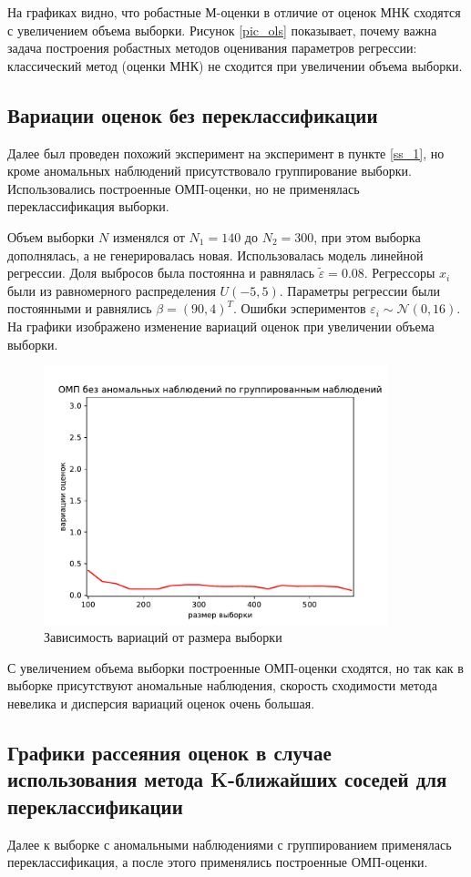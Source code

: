 На графиках видно, что робастные М-оценки в отличие от оценок МНК сходятся с увеличением объема выборки. 
Рисунок \ref{pic_ols} показывает, почему важна задача построения робастных методов оценивания параметров регрессии: классический метод (оценки МНК) не сходится при увеличении объема выборки.

\subsection{Вариации оценок без переклассификации}
Далее был проведен похожий эксперимент на эксперимент в пункте \ref{ss_1}, но кроме аномальных наблюдений присутствовало группирование выборки. Использовались построенные ОМП-оценки, но не применялась переклассификация выборки. 

Объем выборки $N$ изменялся от $N_1=140$ до $N_2=300$, при этом выборка дополнялась, а не генерировалась новая. Использовалась модель линейной регрессии. Доля выбросов была постоянна и равнялась $\widetilde{\varepsilon}=0.08$. 
Регрессоры $x_i$ были из равномерного распределения $U(-5,5)$.  Параметры регрессии были постоянными и равнялись $\beta=(90,4)^T$. Ошибки эспериментов $\varepsilon_i\sim \mathcal{N}(0,16)$.
На графики изображено изменение вариаций оценок при увеличении объема выборки.
\begin{figure}[hb]
    \centering
    \includegraphics[width=100mm]{../images/MLE_no_outliers(2).pdf}
    \caption{Зависимость вариаций от размера выборки\label{overflow}}
    \label{pic6}
\end{figure}

С увеличением объема выборки построенные ОМП-оценки сходятся, но так как в выборке присутствуют аномальные наблюдения, скорость сходимости метода невелика и дисперсия вариаций оценок очень большая. 

\subsection{Графики рассеяния оценок в случае использования метода K-ближайших соседей для переклассификации}
Далее к выборке с аномальными наблюдениями с группированием применялась переклассификация, а после этого применялись построенные ОМП-оценки.

